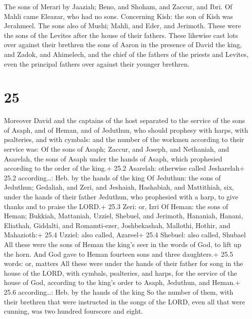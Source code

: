  The sons of Merari by Jaaziah; Beno, and Shoham, and
Zaccur, and Ibri.  Of Mahli came Eleazar, who had no sons.
 Concerning Kish: the son of Kish was Jerahmeel.
 The sons also of Mushi; Mahli, and Eder, and Jerimoth.
These were the sons of the Levites after the house of their fathers.
 These likewise cast lots over against their brethren the
sons of Aaron in the presence of David the king, and Zadok, and
Ahimelech, and the chief of the fathers of the priests and Levites, even
the principal fathers over against their younger brethren.

\hypertarget{section-24}{%
\section{25}\label{section-24}}

 Moreover David and the captains of the host separated to
the service of the sons of Asaph, and of Heman, and of Jeduthun, who
should prophesy with harps, with psalteries, and with cymbals: and the
number of the workmen according to their service was:  Of
the sons of Asaph; Zaccur, and Joseph, and Nethaniah, and Asarelah, the
sons of Asaph under the hands of Asaph, which prophesied according to
the order of the king.+ 25.2 Asarelah: otherwise called Jesharelah+ 25.2
according\ldots: Heb. by the hands of the king  Of Jeduthun:
the sons of Jeduthun; Gedaliah, and Zeri, and Jeshaiah, Hashabiah, and
Mattithiah, six, under the hands of their father Jeduthun, who
prophesied with a harp, to give thanks and to praise the LORD.+ 25.3
Zeri: or, Izri  Of Heman: the sons of Heman; Bukkiah,
Mattaniah, Uzziel, Shebuel, and Jerimoth, Hananiah, Hanani, Eliathah,
Giddalti, and Romamti-ezer, Joshbekashah, Mallothi, Hothir, and
Mahazioth:+ 25.4 Uzziel: also called, Azareel+ 25.4 Shebuel: also
called, Shubael  All these were the sons of Heman the king's
seer in the words of God, to lift up the horn. And God gave to Heman
fourteen sons and three daughters.+ 25.5 words: or, matters 
All these were under the hands of their father for song in the house of
the LORD, with cymbals, psalteries, and harps, for the service of the
house of God, according to the king's order to Asaph, Jeduthun, and
Heman.+ 25.6 according\ldots: Heb. by the hands of the king 
So the number of them, with their brethren that were instructed in the
songs of the LORD, even all that were cunning, was two hundred fourscore
and eight.

